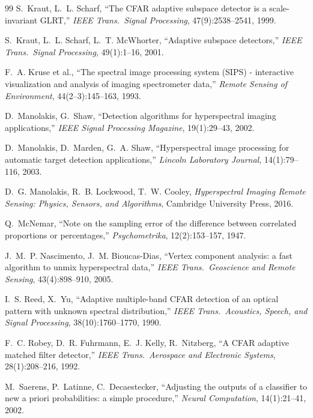 \documentclass[11pt,a4paper]{article}
\theoremstyle{plain}
\theoremstyle{definition}
\theoremstyle{remark}
\begin{document}
\begin{thebibliography}{99}
 S.~Kraut, L.~L. Scharf, ``The CFAR adaptive subspace detector is a scale-invariant GLRT,'' \emph{IEEE Trans.\ Signal
Processing}, 47(9):2538--2541, 1999.

 S.~Kraut, L.~L. Scharf, L.~T. McWhorter, ``Adaptive subspace detectors,'' \emph{IEEE Trans.\ Signal
Processing}, 49(1):1--16, 2001.

 F.~A. Kruse et al., ``The spectral image processing system (SIPS) - interactive visualization and analysis of imaging
spectrometer data,'' \emph{Remote Sensing of Environment}, 44(2--3):145--163, 1993.

 D.~Manolakis, G.~Shaw, ``Detection algorithms for hyperspectral imaging applications,'' \emph{IEEE Signal Processing
Magazine}, 19(1):29--43, 2002.

 D.~Manolakis, D.~Marden, G.~A. Shaw, ``Hyperspectral image processing for automatic target detection applications,''
\emph{Lincoln Laboratory Journal}, 14(1):79--116, 2003.

 D.~G. Manolakis, R.~B. Lockwood, T.~W. Cooley, \emph{Hyperspectral Imaging Remote Sensing: Physics, Sensors, and
Algorithms}, Cambridge University Press, 2016.

 Q.~McNemar, ``Note on the sampling error of the difference between correlated proportions or percentages,''
\emph{Psychometrika}, 12(2):153--157, 1947.

 J.~M.~P. Nascimento, J.~M. Bioucas-Dias, ``Vertex component analysis: a fast algorithm to unmix hyperspectral
data,'' \emph{IEEE Trans.\ Geoscience and Remote Sensing}, 43(4):898--910, 2005.

 I.~S. Reed, X.~Yu, ``Adaptive multiple-band CFAR detection of an optical pattern with unknown spectral distribution,''
\emph{IEEE Trans.\ Acoustics, Speech, and Signal Processing}, 38(10):1760--1770, 1990.

 F.~C. Robey, D.~R. Fuhrmann, E.~J. Kelly, R.~Nitzberg, ``A CFAR adaptive matched filter detector,'' \emph{IEEE Trans.\
Aerospace and Electronic Systems}, 28(1):208--216, 1992.

 M.~Saerens, P.~Latinne, C.~Decaestecker, ``Adjusting the outputs of a classifier to new a priori probabilities: a simple
procedure,'' \emph{Neural Computation}, 14(1):21--41, 2002.


\end{thebibliography}
\end{document}
